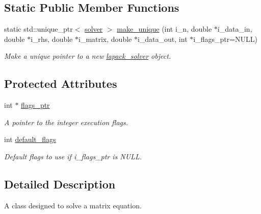 \subsection*{Static Public Member Functions}
\begin{DoxyCompactItemize}
\item 
static std\-::unique\-\_\-ptr$<$ \hyperlink{classbases_1_1solver_a02f41eb5f26a8413ef214c14eab623d4}{solver} $>$ \hyperlink{classone__d_1_1lapack__solver_a92c6f92c65a24ec6d7686acf2869041c}{make\-\_\-unique} (int i\-\_\-n, double $\ast$i\-\_\-data\-\_\-in, double $\ast$i\-\_\-rhs, double $\ast$i\-\_\-matrix, double $\ast$i\-\_\-data\-\_\-out, int $\ast$i\-\_\-flags\-\_\-ptr=N\-U\-L\-L)
\begin{DoxyCompactList}\small\item\em Make a unique pointer to a new \hyperlink{classone__d_1_1lapack__solver}{lapack\-\_\-solver} object. \end{DoxyCompactList}\end{DoxyCompactItemize}
\subsection*{Protected Attributes}
\begin{DoxyCompactItemize}
\item 
\hypertarget{classbases_1_1solver_a3f127eb3297cd2ee2ba15452a18c6331}{int $\ast$ \hyperlink{classbases_1_1solver_a3f127eb3297cd2ee2ba15452a18c6331}{flags\-\_\-ptr}}\label{classbases_1_1solver_a3f127eb3297cd2ee2ba15452a18c6331}

\begin{DoxyCompactList}\small\item\em A pointer to the integer execution flags. \end{DoxyCompactList}\item 
\hypertarget{classbases_1_1solver_a612d48bf6f15d6eccb6fdad64cd0e62d}{int \hyperlink{classbases_1_1solver_a612d48bf6f15d6eccb6fdad64cd0e62d}{default\-\_\-flags}}\label{classbases_1_1solver_a612d48bf6f15d6eccb6fdad64cd0e62d}

\begin{DoxyCompactList}\small\item\em Default flags to use if i\-\_\-flags\-\_\-ptr is N\-U\-L\-L. \end{DoxyCompactList}\end{DoxyCompactItemize}


\subsection{Detailed Description}
A class designed to solve a matrix equation. 



